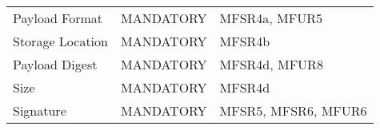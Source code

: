 \documentclass[0-thesis.tex]{subfiles}
\begin{document}
\begin{longtable}[]{@{}lll@{}}
\begin{minipage}[t]{0.32\columnwidth}
    Payload Format\strut
    \end{minipage} & \begin{minipage}[t]{0.36\columnwidth}\raggedright\strut
    MANDATORY\strut
    \end{minipage} & \begin{minipage}[t]{0.23\columnwidth}\raggedright\strut
    MFSR4a, MFUR5\strut
    \end{minipage}\tabularnewline
    \begin{minipage}[t]{0.32\columnwidth}\raggedright\strut
    Storage Location\strut
    \end{minipage} & \begin{minipage}[t]{0.36\columnwidth}\raggedright\strut
    MANDATORY\strut
    \end{minipage} & \begin{minipage}[t]{0.23\columnwidth}\raggedright\strut
    MFSR4b\strut
    \end{minipage}\tabularnewline
    \begin{minipage}[t]{0.32\columnwidth}\raggedright\strut
    Payload Digest\strut
    \end{minipage} & \begin{minipage}[t]{0.36\columnwidth}\raggedright\strut
    MANDATORY\strut
    \end{minipage} & \begin{minipage}[t]{0.23\columnwidth}\raggedright\strut
    MFSR4d, MFUR8\strut
    \end{minipage}\tabularnewline
    \begin{minipage}[t]{0.32\columnwidth}\raggedright\strut
    Size\strut
    \end{minipage} & \begin{minipage}[t]{0.36\columnwidth}\raggedright\strut
    MANDATORY\strut
    \end{minipage} & \begin{minipage}[t]{0.23\columnwidth}\raggedright\strut
    MFSR4d\strut
    \end{minipage}\tabularnewline
    \begin{minipage}[t]{0.32\columnwidth}\raggedright\strut
    Signature\strut
    \end{minipage} & \begin{minipage}[t]{0.36\columnwidth}\raggedright\strut
    MANDATORY\strut
    \end{minipage} & \begin{minipage}[t]{0.23\columnwidth}\raggedright\strut
    MFSR5, MFSR6, MFUR6\strut
    \end{minipage}\tabularnewline

\end{longtable}
\end{document}
